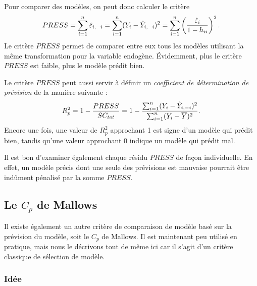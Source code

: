 Pour comparer des modèles, on peut donc calculer le critère
$$PRESS=\sum_{i=1}^n \hat\varepsilon_{i,-i} =\sum_{i=1}^n(Y_i-\hat{Y}_{i,-i})^2=\sum_{i=1}^n\left({\hat\varepsilon_i\over1-h_{ii}}\right)^2.$$
Le critère $PRESS$ permet de comparer entre eux tous les modèles utilisant la m\^eme transformation pour la variable endogène. \'Evidemment, plus le critère $PRESS$ est faible, plus le modèle prédit bien.

Le critère $PRESS$ peut aussi servir à définir un {\em coefficient de détermination de
prévision} de la manière suivante :
\begin{equation}\label{R^2prev}
R^2_{p}=1-{PRESS\over
SC_{tot}}=1-{\sum_{i=1}^n(Y_i-\hat{Y}_{i,-i})^2\over
\sum_{i=1}^n(Y_i-\overline{Y})^2}.
\end{equation}
Encore une fois, une valeur de $R^2_{p}$ approchant 1 est signe
d'un modèle qui prédit bien, tandis qu'une valeur approchant 0
indique un modèle qui prédit mal.

\begin{remarque}
Il est bon d'examiner également chaque résidu $PRESS$ de fa\c{c}on individuelle. En effet, un modèle précis dont une seule des prévisions est mauvaise pourrait être ind\^ument pénalisé par la somme $PRESS$.
\end{remarque}


\subsection{Le $C_p$ de Mallows}

Il existe également un autre critère de comparaison de modèle basé sur la prévision du modèle, soit le $C_p$ de Mallows. Il est maintenant peu utilisé en pratique, mais nous le décrivons tout de même ici car il s'agit d'un critère classique de sélection de modèle.

\label{sec:LeCpDeMallows}

\subsubsection{Idée}

